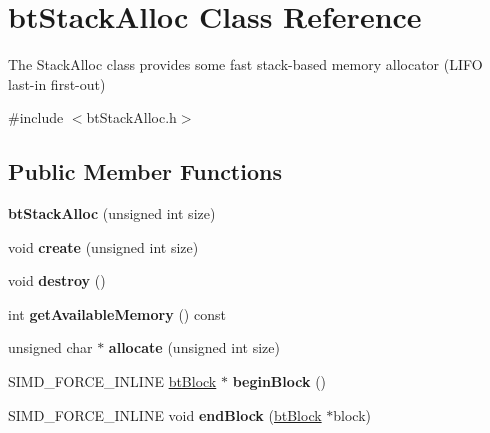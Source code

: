 \hypertarget{classbtStackAlloc}{}\section{bt\+Stack\+Alloc Class Reference}
\label{classbtStackAlloc}


The Stack\+Alloc class provides some fast stack-\/based memory allocator (L\+I\+FO last-\/in first-\/out)  




{\ttfamily \#include $<$bt\+Stack\+Alloc.\+h$>$}

\subsection*{Public Member Functions}
\begin{DoxyCompactItemize}
\item 
\mbox{\label{classbtStackAlloc_aa1f1da74e2983e8f5e3b41228caf3e8d}} 
{\bfseries bt\+Stack\+Alloc} (unsigned int size)
\item 
\mbox{\label{classbtStackAlloc_a7458509926cd6c3e30ce01b8b46741aa}} 
void {\bfseries create} (unsigned int size)
\item 
\mbox{\label{classbtStackAlloc_a1d8b2c69a0f38538adbe8f6193d38218}} 
void {\bfseries destroy} ()
\item 
\mbox{\label{classbtStackAlloc_aac6cc5c5bd9f5b9042829283030e0421}} 
int {\bfseries get\+Available\+Memory} () const
\item 
\mbox{\label{classbtStackAlloc_a88484bf546396b0832589913dedcfe67}} 
unsigned char $\ast$ {\bfseries allocate} (unsigned int size)
\item 
\mbox{\label{classbtStackAlloc_ae8e4baf11b0efda337b30e4c79ae354f}} 
S\+I\+M\+D\+\_\+\+F\+O\+R\+C\+E\+\_\+\+I\+N\+L\+I\+NE \hyperlink{structbtBlock}{bt\+Block} $\ast$ {\bfseries begin\+Block} ()
\item 
\mbox{\label{classbtStackAlloc_a684a3696b6ac56a6316b7e4f6b64c3a3}} 
S\+I\+M\+D\+\_\+\+F\+O\+R\+C\+E\+\_\+\+I\+N\+L\+I\+NE void {\bfseries end\+Block} (\hyperlink{structbtBlock}{bt\+Block} $\ast$block)

\end{DoxyCompactItemize}
